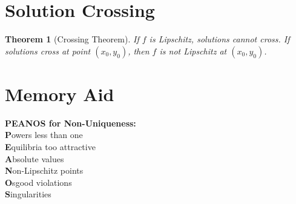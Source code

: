 \documentclass[12pt]{article}
\newtheorem{theorem}{Theorem}
\begin{document}
\section{Solution Crossing}

\begin{theorem}[Crossing Theorem]
If $f$ is Lipschitz, solutions cannot cross. If solutions cross at point $(x_0, y_0)$, then $f$ is not Lipschitz at $(x_0, y_0)$.
\end{theorem}

\section{Memory Aid}

\begin{center}
\textbf{PEANOS for Non-Uniqueness:}\\
\textbf{P}owers less than one\\
\textbf{E}quilibria too attractive\\
\textbf{A}bsolute values\\
\textbf{N}on-Lipschitz points\\
\textbf{O}sgood violations\\
\textbf{S}ingularities
\end{center}
\end{document}
